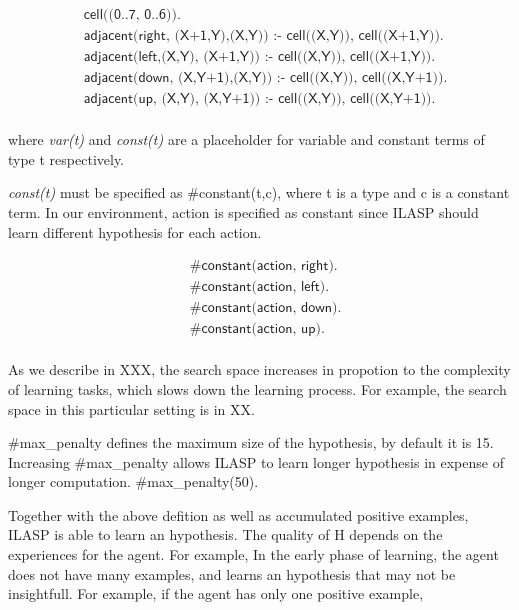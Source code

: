 \begin{equation}
\begin{split}
&\textsf{cell((0..7, 0..6)).}\\
&\textsf{adjacent(right, (X+1,Y),(X,Y)) :- cell((X,Y)), cell((X+1,Y)).} \\
&\textsf{adjacent(left,(X,Y),  (X+1,Y)) :- cell((X,Y)), cell((X+1,Y)).} \\
&\textsf{adjacent(down, (X,Y+1),(X,Y)) :- cell((X,Y)), cell((X,Y+1)).} \\
&\textsf{adjacent(up,   (X,Y),  (X,Y+1)) :- cell((X,Y)), cell((X,Y+1)).} \\
\end{split}
\end{equation}

where \textit{var(t)} and \textit{const(t)} are a placeholder for variable and constant terms of type t respectively.


\textit{const(t)} must be specified as \#constant(t,c), where t is a type and c is a constant term. 
In our environment, action is specified as constant since ILASP should learn different hypothesis for each action.

\begin{equation}
\begin{split}
&\textsf{\#constant(action, right).}\\
&\textsf{\#constant(action, left).}\\
&\textsf{\#constant(action, down).}\\
&\textsf{\#constant(action, up).}\\
\end{split}
\end{equation}

As we describe in XXX, the search space increases in propotion to the complexity of learning tasks, which slows down the learning process.
For example, the search space in this particular setting is in XX. 

\#max\_penalty defines the maximum size of the hypothesis, by default it is 15. 
Increasing \#max\_penalty allows ILASP to learn longer hypothesis in expense of longer computation.
\#max\_penalty(50).

Together with the above defition as well as accumulated positive examples, ILASP is able to learn an hypothesis. The quality of H depends on the experiences for the agent. 
For example, In the early phase of learning, the agent does not have many examples, and learns an hypothesis that may not be insightfull. 
For example, if the agent has only one positive example, 

